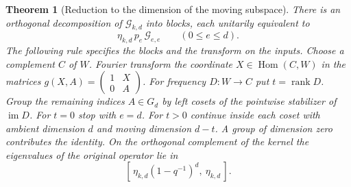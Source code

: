 \documentclass[a4paper,11pt]{article}
\newtheorem{theorem}[proposition]{Theorem}
\theoremstyle{definition}
\theoremstyle{remark}
\numberwithin{equation}{section}
\begin{document}
\begin{theorem}[Reduction to the dimension of the moving subspace]
\leavevmode\label{thm:restrictionrecursion626}
There is an orthogonal decomposition of \(\mathcal G_{k,d}\) into
blocks, each unitarily equivalent to
\[
                  \eta_{k,d}\,p_e\,\mathcal G_{e,e}
                    \qquad (0\le e\le d).
\]
The following rule specifies the blocks and the transform on the inputs.
Choose a complement \(C\) of \(W\). Fourier transform the coordinate
\(X\in\operatorname{Hom}(C,W)\) in the matrices
\(g(X,A)=\left(\begin{smallmatrix}1&X\\0&A\end{smallmatrix}\right)\).
For frequency \(D:W\to C\) put \(t=\operatorname{rank}D\).
Group the remaining indices \(A\in G_d\) by left cosets of the
pointwise stabilizer of \(\operatorname{im}D\).
For \(t=0\) stop with \(e=d\). For \(t>0\) continue inside each coset
with ambient dimension \(d\) and moving dimension \(d-t\).
A group of dimension zero contributes the identity. On the orthogonal
complement of the kernel the eigenvalues of the original operator lie in
\[
            [\,\eta_{k,d}(1-q^{-1})^d,\ \eta_{k,d}\,].
\]
\end{theorem}
\end{document}
